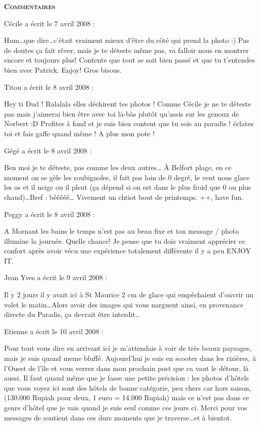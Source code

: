 \bigskip
\textbf{\textsc{Commentaires}}

\medskip
Cécile a écrit le 7 avril 2008 :
\begin{displayquote}
Hum\dots que dire\dots c'était vraiment mieux d'être du côté qui prend la photo :) Pas de doutes ça fait rêver, mais je te déteste même pas, va falloir nous en montrer encore et toujours plus!
Contente que tout se soit bien passé et que tu t'entendes bien avec Patrick. Enjoy!
Gros bisous.
\end{displayquote}

\medskip
Titou a écrit le 8 avril 2008 :
\begin{displayquote}
Hey ti Dud !
Ralalala elles déchirent tes photos ! Comme Cécile je ne te déteste pas mais j'aimerai bien être avec toi là-bàs plutôt qu'assis sur les genoux de Norbert :D
Profites à fond et je suis bien content que tu sois au paradis ! éclates toi et fais gaffe quand même !
A plus mon pote !
\end{displayquote}

\medskip
Gégé a écrit le 8 avril 2008 :
\begin{displayquote}
Ben moi je te déteste, pas comme les deux autres\dots
À Belfort plage, en ce moment on se gèle les roubignoles, il fait pas loin de 0 degré, le vent nous glace les os et il neige ou il pleut (ça dépend si on est dans le plus froid que 0 ou plus chaud)\dots Bref : bêêêêê\dots
Vivement un chtiot bout de printemps.
++, have fun.
\end{displayquote}

\medskip
Peggy a écrit le 8 avril 2008 :
\begin{displayquote}
A Mornant les bains le temps n'est pas au beau fixe et ton message / photo illumine la journée.
Quelle chance!
Je pense que tu dois vraiment apprécier ce confort après avoir vécu une expérience totalement différente il y a peu
ENJOY IT.
\end{displayquote}

\medskip
Jean Yves a écrit le 9 avril 2008 :
\begin{displayquote}
Il y 2 jours il y avait ici à St Maurice 2 cm de glace qui empêchaient d'ouvrir un volet le matin\dots Alors avoir des images qui vous narguent ainsi, en provenance directe du Paradis, ça devrait être interdit\dots
\end{displayquote}

\medskip
Etienne a écrit le 10 avril 2008 :
\begin{displayquote}
Pour tout vous dire en arrivant ici je m'attendais à voir de très beaux paysages, mais je suis quand meme bluffé.
Aujourd'hui je suis en scooter dans les rizières, à l'Ouest de l'île et vous verrez dans mon prochain post que ca vaut le détour, là aussi.
Il faut quand même que je fasse une petite précision : les photos d'hôtels que vous voyez ici sont des hôtels de bonne catégorie, peu chers car hors saison, (130.000 Rupiah pour deux, 1 euro = 14.000 Rupiah) mais ce n'est pas dans ce genre d'hôtel que je vais quand je suis seul comme ces jours ci.
Merci pour vos messages de soutient dans ces durs moments que je traverse\dots et à bientot.
\end{displayquote}

